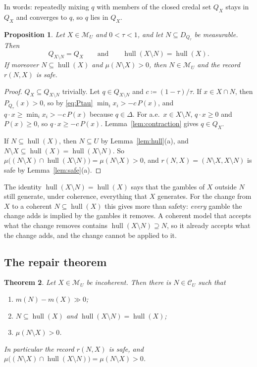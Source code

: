 \documentclass[11pt]{article}
\newcommand{\M}{\mathcal{M}}
\newcommand{\CC}{\mathcal{C}}
\newcommand{\hull}{\operatorname{hull}}
\theoremstyle{plain}
\newtheorem{theorem}{Theorem}[section]
\newtheorem{proposition}[theorem]{Proposition}
\theoremstyle{definition}
\theoremstyle{remark}
\begin{document}
In words: repeatedly mixing $q$ with members of the closed credal set $Q_X$ stays in
$Q_X$ and converges to $q$, so $q$ lies in $Q_X$.

\begin{proposition}\label{prop:shrink}
Let $X\in\M_U$ and $0<\tau<1$, and let $N\subseteq D_{Q_\tau}$ be measurable. Then
\[
  Q_{X\setminus N}=Q_X\qquad\text{and}\qquad\hull(X\setminus N)=\hull(X).
\]
If moreover $N\subseteq\hull(X)$ and $\mu(N\setminus X)>0$, then $N\in\M_U$ and the record
$r(N,X)$ is safe.
\end{proposition}

\begin{proof}
$Q_X\subseteq Q_{X\setminus N}$ trivially. Let $q\in Q_{X\setminus N}$ and $c\coloneqq
(1-\tau)/\tau$. If $x\in X\cap N$, then $P_{Q_\tau}(x)>0$, so by \eqref{eq:Ptau}
$\min_ix_i>-c\,P(x)$, and $q\cdot x\ge\min_ix_i>-c\,P(x)$ because $q\in\Delta$. For
a.e.\ $x\in X\setminus N$, $q\cdot x\ge0$ and $P(x)\ge0$, so $q\cdot x\ge-c\,P(x)$.
Lemma~\ref{lem:contraction} gives $q\in Q_X$.

If $N\subseteq\hull(X)$, then $N\subseteq U$ by Lemma~\ref{lem:hull}(a), and
$N\setminus X\subseteq\hull(X)=\hull(X\setminus N)$. So $\mu\bigl((N\setminus X)\cap
\hull(X\setminus N)\bigr)=\mu(N\setminus X)>0$, and $r(N,X)=(N\setminus X,X\setminus N)$
is safe by Lemma~\ref{lem:safe}(a).
\end{proof}

The identity $\hull(X\setminus N)=\hull(X)$ says that the gambles of $X$ outside $N$ still
generate, under coherence, everything that $X$ generates. For the change from $X$ to a
coherent $N\subseteq\hull(X)$ this gives more than safety: \emph{every} gamble the change
adds is implied by the gambles it removes. A coherent model that accepts what the change
removes contains $\hull(X\setminus N)\supseteq N$, so it already accepts what the change
adds, and the change cannot be applied to it.

\subsection{The repair theorem}

\begin{theorem}\label{thm:H}
Let $X\in\M_U$ be incoherent. Then there is $N\in\CC_U$ such that
\begin{enumerate}[label=(\roman*)]
  \item $m(N)-m(X)\gg0$;
  \item $N\subseteq\hull(X)$ and $\hull(X\setminus N)=\hull(X)$;
  \item $\mu(N\setminus X)>0$.
\end{enumerate}
In particular the record $r(N,X)$ is safe, and $\mu\bigl((N\setminus X)\cap
\hull(X\setminus N)\bigr)=\mu(N\setminus X)>0$.
\end{theorem}
\end{document}
